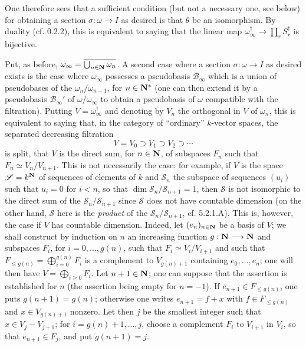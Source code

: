 One therefore sees that a sufficient condition (but not a necessary one, see below) for obtaining a section $\sigma:\omega\to I$ as desired is that $\theta$ be an isomorphism. By duality (cf. 0.2.2), this is equivalent to saying that the linear map $\omega_\infty^\dagger\to\prod_r S_r^\dagger$ is bijective.

\label{VIIB.5.2.1.B}Put, as before, $\omega_\infty=\overline{\bigcup_{n\in\mathbf{N}}\omega_n}$. A second case where a section $\sigma:\omega\to I$ as desired exists is the case where $\omega_\infty$ possesses a pseudobasis $\mathscr B_\infty$ which is a union of pseudobases of the $\omega_n/\omega_{n-1}$, for $n\in\mathbf{N}^*$ (one can then extend it by a pseudobasis $\mathscr B_\infty'$ of $\omega/\omega_\infty$ to obtain a pseudobasis of $\omega$ compatible with the filtration). Putting $V=\omega_\infty^\dagger$ and denoting by $V_n$ the orthogonal in $V$ of $\omega_n$, this is equivalent to saying that, in the category of ``ordinary'' $k$-vector spaces, the separated decreasing filtration
\[
V=V_0\supset V_1\supset V_2\supset\cdots
\]
is split, \ie that $V$ is the direct sum, for $n\in\mathbf{N}$, of subspaces $F_n$ such that $F_n\simeq V_n/V_{n+1}$. This is not necessarily the case: for example, if $V$ is the space $\mathscr S=k^{\mathbf{N}}$ of sequences of elements of $k$ and $\mathscr S_n$ the subspace of sequences $(u_i)$ such that $u_i=0$ for $i<n$, so that $\dim\mathscr S_n/\mathscr S_{n+1}=1$, then $\mathscr S$ is not isomorphic to the direct sum of the $\mathscr S_n/\mathscr S_{n+1}$ since $\mathscr S$ does not have countable dimension (on the other hand, $\mathscr S$ here is the \emph{product} of the $\mathscr S_n/\mathscr S_{n+1}$, cf. 5.2.1.A). This is, however, the case if $V$ has countable dimension. Indeed, let $(e_n)_{n\in\mathbf{N}}$ be a basis of $V$; we shall construct by induction on $n$ an increasing function $g:\mathbf{N}\longrightarrow\mathbf{N}$ and subspaces $F_i$, for $i=0,\ldots,g(n)$, such that $F_i\simeq V_i/V_{i+1}$ and such that $F_{\le g(n)}=\bigoplus_{i=0}^{g(n)}F_i$ is a complement to $V_{g(n)+1}$ containing $e_0,\ldots,e_n$; one will then have $V=\bigoplus_{i\ge0}F_i$. Let $n+1\in\mathbf{N}$; one can suppose that the assertion is established for $n$ (the assertion being empty for $n=-1$). If $e_{n+1}\in F_{\le g(n)}$, one puts $g(n+1)=g(n)$; otherwise one writes $e_{n+1}=f+x$ with $f\in F_{\le g(n)}$ and $x\in V_{g(n)+1}$ nonzero. Let then $j$ be the smallest integer such that $x\in V_j-V_{j+1}$; for $i=g(n)+1,\ldots,j$, choose a complement $F_i$ to $V_{i+1}$ in $V_i$, so that $e_{n+1}\in F_j$, and put $g(n+1)=j$.

